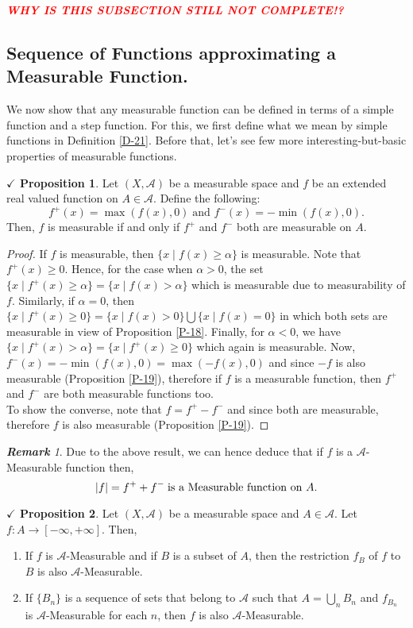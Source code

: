 \documentclass{article}
\theoremstyle{definition}
\theoremstyle{remark}
\newtheorem*{remark}{\textbf{Remark}}
\theoremstyle{definition}
\theoremstyle{definition}
\newtheorem{proposition}{$\checkmark$ Proposition}
\theoremstyle{definition}
\DeclarePairedDelimiter\abs{\lvert}{\rvert}
\newcommand{\bunion}{\bigcup}
\newcommand{\where}{\;\vert\;}
\newcommand{\alg}[1]{\mathscr{#1}}
\begin{document}
\textcolor{red}{\emph{\textbf{WHY IS THIS SUBSECTION STILL NOT COMPLETE!?}}}
\newpage
\subsection{Sequence of Functions approximating a Measurable Function.}
We now show that any measurable function can be defined in terms of a simple function and a step function. For this, we first define what we mean by simple functions in Definition \ref{D-21}. Before that, let's see few more interesting-but-basic properties of measurable functions. 
\begin{proposition}\label{P-25}
	Let $ (X,\alg{A}) $ be a measurable space and $ f $ be an extended real valued function on $ A\in \alg{A} $. Define the following:
	\[f^{+}(x) = \max (f(x),0)\;\text{and } f^{-}(x) = -\min (f(x),0).\]
	Then, $ f $ is measurable if and only if $ f^{+} $ and $ f^{-} $ both are measurable on $ A $.
\end{proposition}
\begin{proof}
	If $ f $ is measurable, then $ \{x\where f(x)\ge \alpha\} $ is measurable. Note that $ f^{+}(x) \ge 0$. Hence, for the case when $ \alpha > 0 $, the set $ \{x\where f^{+}(x)\ge \alpha\} = \{x\where f(x) > \alpha\}$ which is measurable due to measurability of $ f $. Similarly, if $ \alpha = 0 $, then $ \{x\where f^{+}(x)\ge 0\} = \{x\where f(x)> 0\} \bunion \{x\where f(x) = 0\} $ in which both sets are measurable in view of Proposition \ref{P-18}. Finally, for $ \alpha<0 $, we have $ \{x\where f^{+}(x)> \alpha\} = \{x\where f^{+}(x)\ge 0\}$ which again is measurable. Now, $ f^{-}(x) = -\min(f(x),0) = \max(-f(x),0)$ and since $ -f $ is also measurable (Proposition \ref{P-19}), therefore if $ f $ is a measurable function, then $ f^{+} $ and $ f^{-} $ are both measurable functions too.\\
	To show the converse, note that $ f = f^{+} - f^{-} $ and since both are measurable, therefore $ f $ is also measurable (Proposition \ref{P-19}).
\end{proof}
\begin{remark}
	Due to the above result, we can hence deduce that if $ f $ is a $ \alg{A} $-Measurable function then,
	\[\abs{f} = f^{+} + f^{-}\;\text{is a Measurable function on $ A $.}\]
\end{remark}
\hrulefill
\begin{proposition}
	Let $ (X,\alg{A}) $ be a measurable space and $ A\in \alg{A} $. Let $ f : A\to [-\infty,+\infty]$. Then,
	\begin{enumerate}
		\item {If $ f $ is $ \alg{A} $-Measurable and if $ B $ is a subset of $ A $, then the restriction $ f_{B} $ of $ f $ to $ B $ is also $ \alg{A} $-Measurable. }
		\item {If $ \{B_n\} $ is a sequence of sets that belong to $ \alg{A} $ such that $ A = \bunion_{n}B_n $ and $ f_{B_n} $ is $ \alg{A}$-Measurable for each $ n $, then $ f $ is also $ \alg{A} $-Measurable.}
	\end{enumerate}
\end{proposition}
\end{document}
